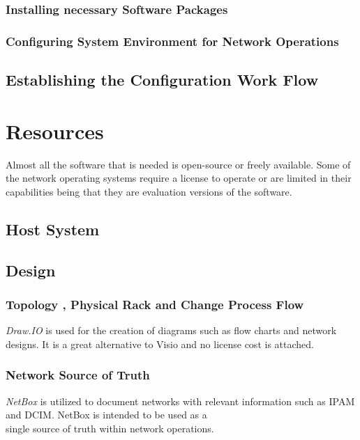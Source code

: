 \documentclass[12pt, letterpaper]{article}
\begin{document}
	\subsubsection{Installing necessary Software Packages}
	
	\subsubsection{Configuring System Environment for Network Operations}

	\subsection{Establishing the Configuration Work Flow}

	
		
		

\newpage

\section{Resources}

Almost all the software that is needed is open-source or freely available. Some of the network operating systems require a license to operate or are limited in their capabilities being that they are evaluation versions of the software.
	
	\subsection{Host System}
	
	\subsection{Design}
	
		\subsubsection{Topology , Physical Rack and Change Process Flow}
\textit{Draw.IO} is used for the creation of diagrams such as flow charts and network designs. It is a great alternative to Visio and no license cost is attached.

		\subsubsection{Network Source of Truth}
\textit{NetBox} is utilized to document networks with relevant information such as IPAM and DCIM. NetBox is intended to be used as a \\ single source of truth within network operations.
	
\end{document}
